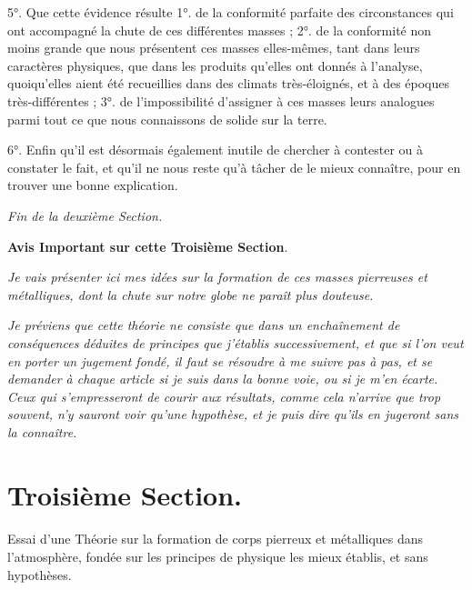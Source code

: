\documentclass[a4paper, 11pt, oneside, polutonikogreek, french]{article}
\begin{document}
5°. Que cette évidence résulte 1°. de la conformité parfaite des circonstances qui ont accompagné la chute de ces différentes masses ; 2°. de la conformité non moins grande que nous présentent ces masses elles-mêmes, tant dans leurs caractères physiques, que dans les produits qu'elles ont donnés à l'analyse, quoiqu'elles aient été recueillies dans des climats très-éloignés, et à des époques très-différentes ; 3°. de l'impossibilité d'assigner à ces masses leurs analogues parmi tout ce que nous connaissons de solide sur la terre.

6°. Enfin qu'il est désormais également inutile de chercher à contester ou à constater le fait, et qu'il ne nous reste qu'à tâcher de le mieux connaître, pour en trouver une bonne explication.

\emph{Fin de la deuxième Section.}
\clearpage
\vspace*{\fill}
\begin{center}
\textbf{Avis Important sur cette Troisième Section}.
\end{center}

\emph{Je vais présenter ici mes idées sur la formation de ces masses pierreuses et métalliques, dont la chute sur notre globe ne paraît plus douteuse.}

\emph{Je préviens que cette théorie ne consiste que dans un enchaînement de conséquences déduites de principes que j'établis successivement, et que si l'on veut en porter un jugement fondé, il faut se résoudre à me suivre pas à pas, et se demander à chaque article si je suis dans la bonne voie, ou si je m'en écarte. Ceux qui s'empresseront de courir aux résultats, comme cela n'arrive que trop souvent, n'y sauront voir qu'une hypothèse, et je puis dire qu'ils en jugeront sans la connaître.}
\vspace*{\fill}
\clearpage
\section{Troisième Section.}
\paragraph{}
Essai d'une Théorie sur la formation de corps pierreux et métalliques dans l'atmosphère, fondée sur les principes de physique les mieux établis, et sans hypothèses.
\end{document}
